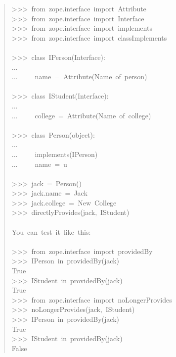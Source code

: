 \documentclass[a4paper,openany,twoside,final]{book}
\begin{document}
\begin{quote}{\ttfamily \raggedright \noindent
>{}>{}>~from~zope.interface~import~Attribute\\
>{}>{}>~from~zope.interface~import~Interface\\
>{}>{}>~from~zope.interface~import~implements\\
>{}>{}>~from~zope.interface~import~classImplements\\
~\\
>{}>{}>~class~IPerson(Interface):\\
...\\
...~~~~~name~=~Attribute(\textquotedbl{}Name~of~person\textquotedbl{})\\
~\\
>{}>{}>~class~IStudent(Interface):\\
...\\
...~~~~~college~=~Attribute(\textquotedbl{}Name~of~college\textquotedbl{})\\
~\\
>{}>{}>~class~Person(object):\\
...\\
...~~~~~implements(IPerson)\\
...~~~~~name~=~u\textquotedbl{}\textquotedbl{}\\
~\\
>{}>{}>~jack~=~Person()\\
>{}>{}>~jack.name~=~\textquotedbl{}Jack\textquotedbl{}\\
>{}>{}>~jack.college~=~\textquotedbl{}New~College\textquotedbl{}\\
>{}>{}>~directlyProvides(jack,~IStudent)\\
~\\
You~can~test~it~like~this:\\
~\\
>{}>{}>~from~zope.interface~import~providedBy\\
>{}>{}>~IPerson~in~providedBy(jack)\\
True\\
>{}>{}>~IStudent~in~providedBy(jack)\\
True\\
>{}>{}>~from~zope.interface~import~noLongerProvides\\
>{}>{}>~noLongerProvides(jack,~IStudent)\\
>{}>{}>~IPerson~in~providedBy(jack)\\
True\\
>{}>{}>~IStudent~in~providedBy(jack)\\
False
}
\end{quote}
\end{document}
